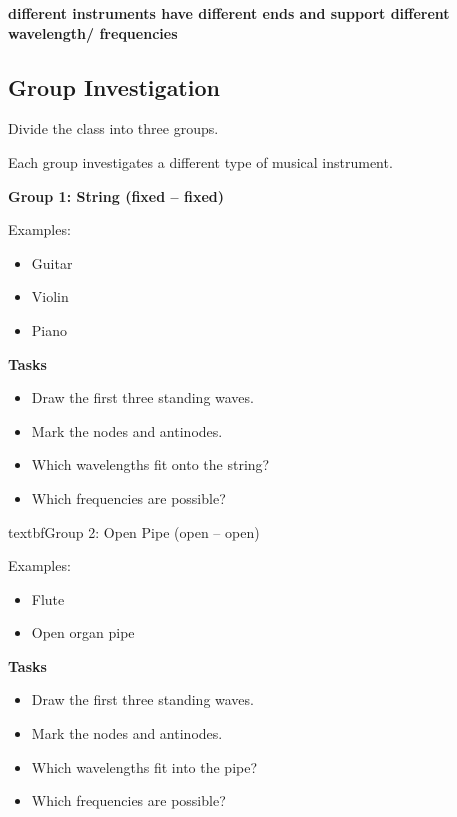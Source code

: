 \documentclass[a4paper,11pt]{article}
\begin{document}
\textbf{different instruments have different ends and support different wavelength/ frequencies }

\subsection*{Group Investigation}

Divide the class into three groups.

Each group investigates a different type of musical instrument.

\vspace{0.5em}

\textbf{Group 1: String (fixed -- fixed)}

Examples:
\begin{itemize}
    \item Guitar
    \item Violin
    \item Piano
\end{itemize}

\textbf{Tasks}

\begin{itemize}
    \item Draw the first three standing waves.
    \item Mark the nodes and antinodes.
    \item Which wavelengths fit onto the string?
    \item Which frequencies are possible?
\end{itemize}

\vspace{0.5em}
textbf{Group 2: Open Pipe (open -- open)}

Examples:
\begin{itemize}
    \item Flute
    \item Open organ pipe
\end{itemize}

\textbf{Tasks}

\begin{itemize}
    \item Draw the first three standing waves.
    \item Mark the nodes and antinodes.
    \item Which wavelengths fit into the pipe?
    \item Which frequencies are possible?
\end{itemize}

\vspace{0.5em}
\end{document}
